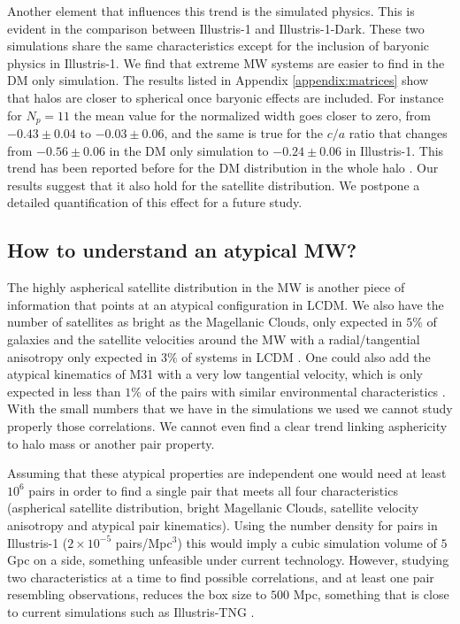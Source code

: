\documentclass[a4paper,fleqn,usenatbib]{mnras}
\begin{document}
Another element that influences this trend is the simulated physics.
This is evident in the comparison between Illustris-1 and Illustris-1-Dark.
These two simulations share the same characteristics except for the
inclusion of baryonic physics in Illustris-1.
We find that extreme MW systems are easier to find in the DM only
simulation. 
The results listed in Appendix \ref{appendix:matrices} show that
halos are closer to spherical once baryonic effects are included. 
For instance for $N_p=11$ the mean value for the normalized width goes
closer to zero, from $-0.43\pm 0.04$  to $-0.03\pm0.06$, and the same
is true for the $c/a$ ratio that changes from $-0.56\pm0.06$ in the DM
only simulation to $-0.24\pm 0.06$ in Illustris-1.  
This trend has been reported before for the DM distribution in the
whole halo \cite{2013MNRAS.429.3316B}.
Our results suggest that it also hold for the satellite distribution.
We postpone a detailed quantification of this effect for a future
study.  


\subsection{How to understand an atypical MW?}

The highly aspherical satellite distribution in the MW is another piece of
information that points at an atypical configuration in LCDM.
We also have the number of satellites as bright as the Magellanic
Clouds, only expected in $5\%$ of galaxies
\citep{2011ApJ...743..117B} and 
the satellite velocities around the MW with a radial/tangential
anisotropy only expected in $3\%$ of systems in LCDM
\citep{2017MNRAS.468L..41C}. 
One could also add the atypical kinematics of M31 with a very low
tangential velocity, which is only expected in less than $1\%$ of the pairs
with similar environmental characteristics \citep{ForeroRomero2013}.  
With the small numbers that we have in the simulations we used we
cannot study properly those correlations. 
We cannot even find a clear trend linking asphericity to halo mass or
another pair property.

Assuming that these atypical properties are independent one would need at
least $10^6$ pairs in order to find a single pair that meets all four
characteristics (aspherical satellite distribution, bright Magellanic
Clouds, satellite velocity anisotropy and atypical pair kinematics).
Using the number density for pairs in Illustris-1 ($2\times 10^{-5}$
pairs/Mpc$^{3}$) this would imply a cubic simulation volume of $5$ Gpc on a
side, something unfeasible under current technology.
However, studying two characteristics at a time to find possible
correlations, and at least one pair resembling observations, reduces
the box size to $500$ Mpc, something that is close to current
simulations such as Illustris-TNG \citep{2018MNRAS.473.4077P}. 
\end{document}
